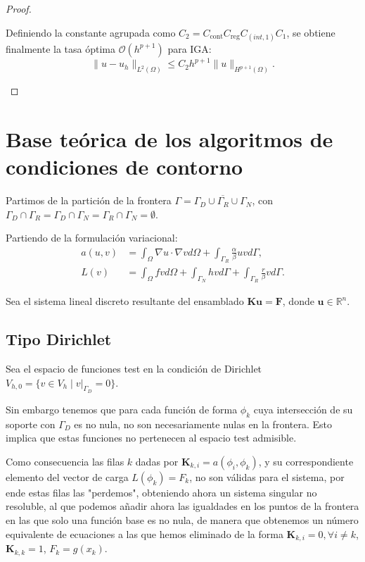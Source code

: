 \documentclass[11pt]{book}
\theoremstyle{plain} %
\theoremstyle{definition} %
\theoremstyle{definition} %
\newcommand\R{\mathbb{R}}
\begin{document}
\begin{proof}
\begin{enumerate}
        Definiendo la constante agrupada como $C_2 = C_{\text{cont}} C_{\text{reg}} C_{(int, 1)} C_1$, se obtiene finalmente la tasa óptima $\mathcal{O}(h^{p+1})$ para IGA:
        \begin{equation*}
            \|u - u_h\|_{L^2(\Omega)} \leq C_2 h^{p+1} \|u\|_{H^{p+1}(\Omega)}.
        \end{equation*}
    \end{enumerate}
\end{proof}

\section{Base teórica de los algoritmos de condiciones de contorno}
\label{cond:contorno}
Partimos de la partición de la frontera $\Gamma = \overline{\Gamma_D \cup \Gamma_R \cup \Gamma_N}$, con $\Gamma_D \cap \Gamma_R = \Gamma_D \cap \Gamma_N = \Gamma_R \cap \Gamma_N = \emptyset$.

Partiendo de la formulación variacional:
\begin{align} \label{form:variacional1}
     a(u,v) &= \int_{\Omega}\nabla u \cdot \nabla v d\Omega + \int_{\Gamma_R}\frac{\alpha}{\beta}uv d\Gamma, \\
     \label{form:variacional2}
     L(v) &= \int_{\Omega}fv  d\Omega + \int_{\Gamma_N}hv d\Gamma + \int_{\Gamma_R}\frac{r}{\beta}v d\Gamma. 
\end{align}

Sea el sistema lineal discreto resultante del ensamblado $\mathbf{K}\mathbf{u}=\mathbf{F}$, donde $\mathbf{u} \in \R^n$.

\subsection{Tipo Dirichlet}

Sea el espacio de funciones test en la condición de Dirichlet $V_{h,0} = \{ v \in V_h \mid v|_{\Gamma_D} = 0 \}$.

Sin embargo tenemos que para cada función de forma $\phi_k$ cuya intersección de su soporte con $\Gamma_D$ es no nula, no son necesariamente nulas en la frontera.
Esto implica que estas funciones no pertenecen al espacio test admisible.

Como consecuencia las filas $k$ dadas por
$\mathbf{K}_{k,i}=a(\phi_i,\phi_k)$, y su correspondiente elemento del vector de carga $L(\phi_k)=F_k$, no son válidas para el sistema, por ende estas filas las "perdemos", obteniendo ahora un
sistema singular no resoluble, al que podemos añadir ahora las igualdades en los puntos de la frontera en las que solo una función base es no nula, de manera
que obtenemos un número equivalente de ecuaciones a las que hemos eliminado de la forma $\mathbf{K}_{k,i}=0, \forall i \neq k$, $\mathbf{K}_{k,k}=1$, $F_k=g(x_k)$.
\end{document}
